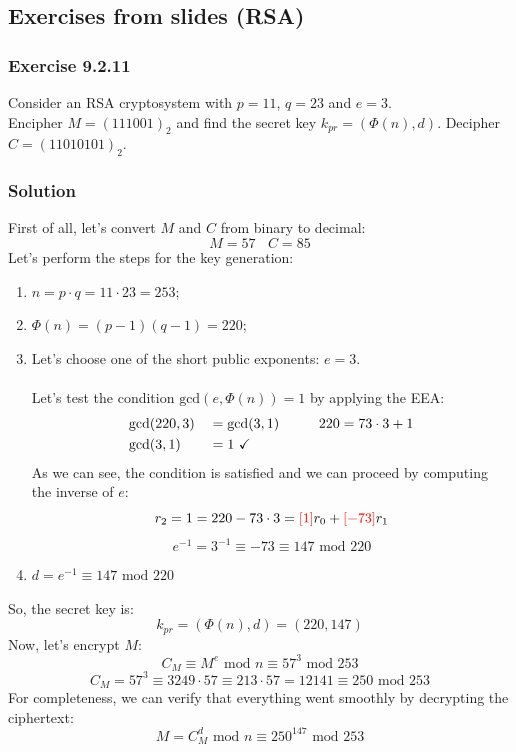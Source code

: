 \documentclass[11pt, a4paper]{article}
\newcommand{\mymod}{
    \text{ mod }
}
\begin{document}
\newpage
\subsection{Exercises from slides (RSA)}
\subsubsection{Exercise 9.2.11}
Consider an RSA cryptosystem with $p=11$, $q=23$ and $e=3$.\\Encipher $M=(111001)_2$ and find the secret key $k_{pr}=(\Phi(n),d)$. Decipher $C=(11010101)_2$.

\subsubsection*{Solution}
First of all, let's convert $M$ and $C$ from binary to decimal:
$$M=57\ \ \ \ C=85$$
Let's perform the steps for the key generation:
\begin{enumerate}
    \item $n=p\cdot q=11\cdot23=253$;
    \item $\Phi(n)=(p-1)(q-1)=220$;
    \item Let's choose one of the short public exponents: $e=3$.\\\\
    Let's test the condition $\text{gcd}(e,\Phi(n))=1$ by applying the EEA:
    \begin{alignat*}{2}
        &\text{gcd}(220,3)&&=\text{gcd}(3,1)\hspace{1cm}220=73\cdot3+1\\
        &\text{gcd}(3,1)&&=1\text{ \checkmark}
    \end{alignat*}
    As we can see, the condition is satisfied and we can proceed by computing the inverse of $e$:
    $$r_2=1=220-73\cdot3=\textcolor{red}{[1]}r_0+\textcolor{red}{[-73]}r_1$$
    $$e^{-1}=3^{-1}\equiv-73\equiv147\mymod220$$
    \item $d= e^{-1}\equiv147\mymod220$
\end{enumerate}
So, the secret key is:
$$k_{pr}=(\Phi(n), d)=(220,147)$$
Now, let's encrypt $M$:
$$C_M\equiv M^e\mymod n\equiv57^3\mymod253$$
$$C_M=57^3\equiv3249\cdot57\equiv213\cdot57=12141\equiv250\mymod253$$
For completeness, we can verify that everything went smoothly by decrypting the ciphertext:
$$M=C_M^d\mymod n\equiv250^{147}\mymod253$$
\end{document}
